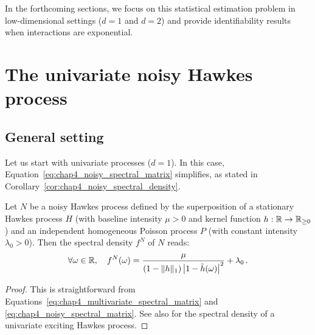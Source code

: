         In the forthcoming sections, we focus on this statistical estimation problem in low-dimensional settings ($d=1$ and $d=2$) and provide identifiability results when interactions are exponential.


      \section{The univariate noisy Hawkes process}\label{sec:chap4_univariate_noisy_hawkes}
        \subsection{General setting}
	        Let us start with univariate processes ($d=1$).
	        In this case, Equation~\eqref{eq:chap4_noisy_spectral_matrix} simplifies, as stated in Corollary~\ref{cor:chap4_noisy_spectral_density}.
          \begin{corollary}\label{cor:chap4_noisy_spectral_density}
	          Let $N$ be a noisy Hawkes process defined by the superposition of a stationary Hawkes process $H$
	          (with baseline intensity $\mu > 0$ and kernel function $h : {\mathbb R} \to {\mathbb R}_{\ge 0}$)
	          and an independent homogeneous Poisson process $P$ (with constant intensity $\lambda_0 > 0$).
	          Then the spectral density $f^N$ of $N$ reads:
	          \begin{equation*}
		          \forall \omega \in {\mathbb R}, \quad
		          f^N(\omega) = \frac{\mu}{\left(1 - \|h\|_1 \right) \left \lvert 1 - \tilde h(\omega) \right \rvert^2} + \lambda_0\,.
	          \end{equation*}
          \end{corollary}

          \begin{proof}
            This is straightforward from Equations~\eqref{eq:chap4_multivariate_spectral_matrix} and \eqref{eq:chap4_noisy_spectral_matrix}.
            See also \textcite[Example 8.2(e)]{DaleyV1} for the spectral density of a univariate exciting Hawkes process.
          \end{proof}
          
